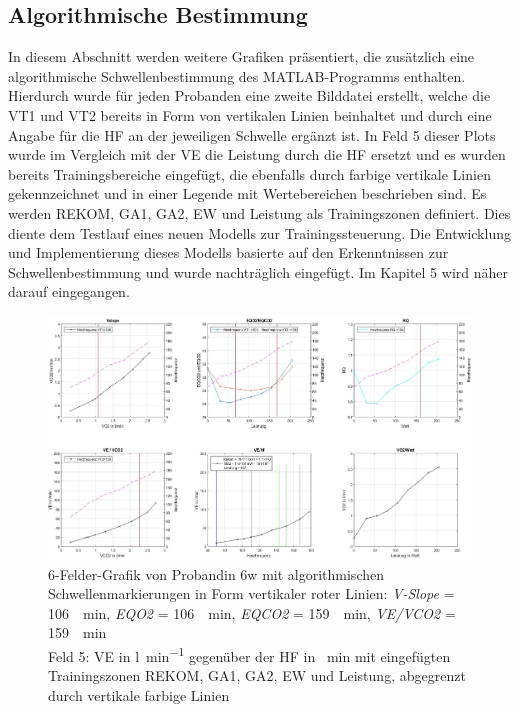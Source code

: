 \subsection{Algorithmische Bestimmung}
%
In diesem Abschnitt werden weitere Grafiken präsentiert, die zusätzlich eine algorithmische Schwellenbestimmung des MATLAB-Programms enthalten. Hierdurch wurde für jeden Probanden eine zweite Bilddatei erstellt, welche die VT1 und VT2 bereits in Form von vertikalen Linien beinhaltet und durch eine Angabe für die \acs{HF} an der jeweiligen Schwelle ergänzt ist. In Feld 5 dieser Plots wurde im Vergleich mit der \acs{VE} die Leistung durch die \acs{HF} ersetzt und es wurden bereits Trainingsbereiche eingefügt, die ebenfalls durch farbige vertikale Linien gekennzeichnet und in einer Legende mit Wertebereichen beschrieben sind. Es werden \ac{REKOM}, \ac{GA1}, \ac{GA2}, \ac{EW} und Leistung als Trainingszonen definiert. Dies diente dem Testlauf eines neuen Modells zur Trainingssteuerung. Die Entwicklung und Implementierung dieses Modells basierte auf den Erkenntnissen zur Schwellenbestimmung und wurde nachträglich eingefügt. Im Kapitel 5 wird näher darauf eingegangen.
%
\begin{figure}[H]
	\centering
	\noindent\includegraphics[angle=0,width=\linewidth,keepaspectratio]{Bilder/auto_6}
	\caption[6-Felder-Grafik von Probandin 6w mit algorithmischen Schwellenmarkierungen]{6-Felder-Grafik von Probandin 6w mit algorithmischen Schwellenmarkierungen in Form vertikaler roter Linien: \textsl{V-Slope} = \SI{106}{\per\minute}, \textsl{\acs{EQO2}} = \SI{106}{\per\minute}, \textsl{\acs{EQCO2}} = \SI{159}{\per\minute}, \textsl{\acs{VE}/\acs{VCO2}} = \SI{159}{\per\minute}\\Feld 5: \acs{VE} in \si{\litre\per\minute} gegenüber der \acs{HF} in \si{\per\minute} mit eingefügten Trainingszonen \acs{REKOM}, \acs{GA1}, \acs{GA2}, \acs{EW} und Leistung, abgegrenzt durch vertikale farbige Linien}
	\label{pic:pic17}
\end{figure}

